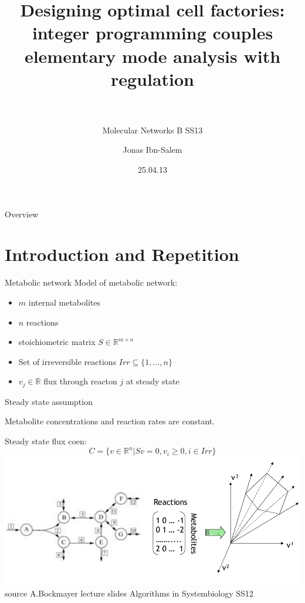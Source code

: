 \documentclass{beamer}
\title[Elementary flux mode analysis]{Designing optimal cell factories: integer programming couples elementary mode analysis with regulation\\~\\}
\subtitle{Molecular Networks B SS13}
\author[Jonas Ibn-Salem]{Jonas Ibn-Salem}
\institute[]{}
\date{25.04.13}
\begin{document}
\maketitle


\begin{frame}{Overview}
    \tableofcontents
\end{frame}

\section{Introduction and Repetition}

\begin{frame}{Metabolic network}
	Model of metabolic network:
	\begin{itemize}
		\item $m$ internal metabolites
		\item $n$ reactions
		\item stoichiometric matrix $S \in \mathbb{R}^{m\times n}$
		\item Set of irreversible reactions $Irr \subseteq \{1, ..., n\}$
		\item $v_j \in \mathbb{R}$ flux through reacton $j$ at steady state
	\end{itemize}
\end{frame}

\begin{frame}{Steady state assumption}    
    \begin{block}{}
        Metabolite concentrations and reaction rates are constant.
    \end{block}
    Steady state flux coen:
    $$C = \{v \in \mathbb{R}^n | Sv = 0, v_i \geq 0, i \in Irr \}$$
    \includegraphics[width=\textwidth]{grafik/modelling} \\
    \hfill \tiny{source A.Bockmayer lecture slides Algorithms in Systembiology SS12}
\end{frame}
\end{document}
